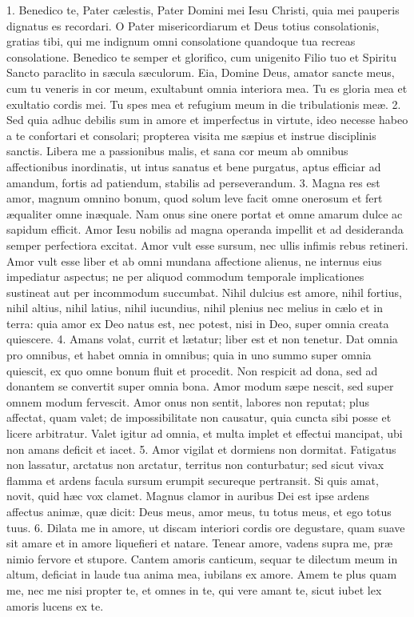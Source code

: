1. Benedico te, Pater cælestis, Pater Domini mei Iesu Christi, quia mei pauperis dignatus es recordari. O Pater misericordiarum et Deus totius consolationis, gratias tibi, qui me indignum omni consolatione quandoque tua recreas consolatione. Benedico te semper et glorifico, cum unigenito Filio tuo et Spiritu Sancto paraclito in sæcula sæculorum. Eia, Domine Deus, amator sancte meus, cum tu veneris in cor meum, exultabunt omnia interiora mea. Tu es gloria mea et exultatio cordis mei. Tu spes mea et refugium meum in die tribulationis meæ.
2. Sed quia adhuc debilis sum in amore et imperfectus in virtute, ideo necesse habeo a te confortari et consolari; propterea visita me sæpius et instrue disciplinis sanctis. Libera me a passionibus malis, et sana cor meum ab omnibus affectionibus inordinatis, ut intus sanatus et bene purgatus, aptus efficiar ad amandum, fortis ad patiendum, stabilis ad perseverandum.
3. Magna res est amor, magnum omnino bonum, quod solum leve facit omne onerosum et fert æqualiter omne inæquale. Nam onus sine onere portat et omne amarum dulce ac sapidum efficit. Amor Iesu nobilis ad magna operanda impellit et ad desideranda semper perfectiora excitat. Amor vult esse sursum, nec ullis infimis rebus retineri. Amor vult esse liber et ab omni mundana affectione alienus, ne internus eius impediatur aspectus; ne per aliquod commodum temporale implicationes sustineat aut per incommodum succumbat. Nihil dulcius est amore, nihil fortius, nihil altius, nihil latius, nihil iucundius, nihil plenius nec melius in cælo et in terra: quia amor ex Deo natus est, nec potest, nisi in Deo, super omnia creata quiescere.
4. Amans volat, currit et lætatur; liber est et non tenetur. Dat omnia pro
omnibus, et habet omnia in omnibus; quia in uno summo super omnia quiescit, ex quo omne bonum fluit et procedit. Non respicit ad dona, sed ad donantem se convertit super omnia bona. Amor modum sæpe nescit, sed super omnem modum fervescit. Amor onus non sentit, labores non reputat; plus affectat, quam valet; de impossibilitate non causatur, quia cuncta sibi posse et licere arbitratur. Valet igitur ad omnia, et multa implet et effectui mancipat, ubi non amans deficit et iacet.
5. Amor vigilat et dormiens non dormitat. Fatigatus non lassatur, arctatus non arctatur, territus non conturbatur; sed sicut vivax flamma et ardens facula sursum erumpit secureque pertransit. Si quis amat, novit, quid hæc vox clamet. Magnus clamor in auribus Dei est ipse ardens affectus animæ, quæ dicit: Deus meus, amor meus, tu totus meus, et ego totus tuus.
6. Dilata me in amore, ut discam interiori cordis ore degustare, quam suave sit amare et in amore liquefieri et natare. Tenear amore, vadens supra me, præ nimio fervore et stupore. Cantem amoris canticum, sequar te dilectum meum in altum, deficiat in laude tua anima mea, iubilans ex amore. Amem te plus quam me, nec me nisi propter te, et omnes in te, qui vere amant te, sicut iubet lex amoris lucens ex te.
